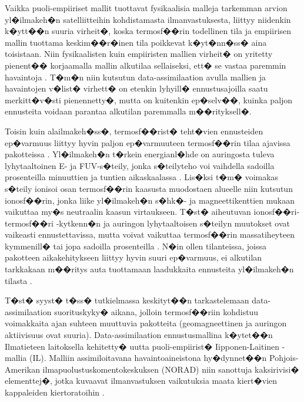 \documentclass[12pt,a4paper,finnish,margin=2in]{article}
\begin{document}
Vaikka puoli-empiiriset mallit tuottavat fysikaalisia malleja tarkemman arvion yl�ilmakeh�n satelliitteihin kohdistamasta ilmanvastuksesta, liittyy niidenkin k�ytt��n suuria virheit�, koska termosf��rin todellinen tila ja empiirisen mallin tuottama keskim��r�inen tila poikkevat k�yt�nn�ss� aina toisistaan. Niin fysikaalisten kuin empiiristen mallien virheit� on yritetty pienent�� korjaamalla mallin alkutilaa sellaiseksi, ett� se vastaa paremmin havaintoja \citep[esim.][]{matsuo_2012,doornbos_2008,storz_2005,chartier_2016}. T�m�n niin kutsutun data-assimilaation avulla mallien ja havaintojen v�list� virhett� on etenkin lyhyill� ennustusajoilla saatu merkitt�v�sti pienennetty�, mutta on kuitenkin ep�selv��, kuinka paljon ennusteita voidaan parantaa alkutilan paremmalla m��rityksell�. 

Toisin kuin alailmakeh�ss�, termosf��rist� teht�vien ennusteiden ep�varmuus liittyy hyvin paljon ep�varmuuteen termosf��rin tilaa ajavissa pakotteissa \citep{mannucci_2016}. Yl�ilmakeh�n t�rkein energianl�hde on auringosta tuleva lyhytaaltoinen E- ja FUV-s�teily, jonka s�teilyteho voi vaihdella sadoilla prosenteilla minuuttien ja tuntien aikaskaalassa \citep[esim.][]{Tsurutani_2005}. Lis�ksi t�m� voimakas s�teily ionisoi osan termosf��rin kaasusta muodostaen alueelle niin kutsutun ionosf��rin, jonka liike yl�ilmakeh�n s�hk�- ja magneettikenttien mukaan vaikuttaa my�s neutraalin kaasun virtaukseen. T�st� aiheutuvan ionosf��ri-termosf��ri -kytkenn�n ja auringon lyhytaaltoisen s�teilyn muutokset ovat vaikeasti ennustettavissa, mutta voivat vaikuttaa termosf��rin massatiheyteen kymmenill� tai jopa sadoilla prosenteilla \citep[esim.][]{emmert_2015}. N�in ollen tilanteissa, joissa pakotteen aikakehitykseen liittyy hyvin suuri ep�varmuus, ei alkutilan tarkkakaan m��ritys auta tuottamaan laadukkaita ennusteita yl�ilmakeh�n tilasta \citep{chen_2016}.

T�st� syyst� t�ss� tutkielmassa keskityt��n tarkastelemaan data-assimilaation suorituskyky� aikana, jolloin termosf��riin kohdistuu voimakkaita ajan suhteen muuttuvia pakotteita (geomagneettinen ja auringon aktiivisuus ovat suuria). Data-assimilaation ennustusmallina k�ytet��n Ilmatieteen laitoksella kehitetty� uutta puoli-empiirist� Iipponen-Laitinen -mallia (IL). Malliin assimiloitavana havaintoaineistona hy�dynnet��n Pohjois-Amerikan ilmapuolustuskomentokeskuksen (NORAD) niin sanottuja kaksirivisi� elementtej�, jotka kuvaavat ilmanvastuksen vaikutuksia maata kiert�vien kappaleiden kiertoratoihin \citep[esim.][]{picone_2005}. 
\end{document}
